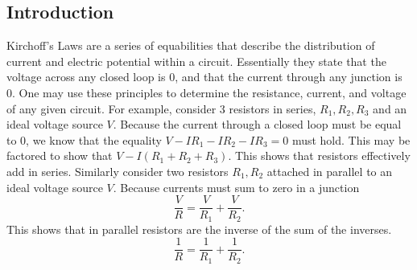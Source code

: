 \documentclass[11pt]{article}
\begin{document}
\subsection{Introduction}
	Kirchoff's Laws are a series of equabilities that describe the distribution of current and electric potential within a circuit. Essentially they state that the voltage across any closed loop is 0, and that the current through any junction is 0. One may use these principles to determine the resistance, current, and voltage of any given circuit. For example, consider 3 resistors in series, \(R_1,R_2,R_3\) and an ideal voltage source \(V\). Because the current through a closed loop must be equal to 0, we know that the equality \( V - I R_1 - I R_2 - I R_3 = 0\) must hold. This may be factored to show that \(V - I(R_1+R_2+R_3) \). This shows that resistors effectively add in series. Similarly consider two resistors \(R_1, R_2\)  attached in parallel to an ideal voltage source \(V\). Because currents must sum to zero in a junction \begin{equation}
	\frac{V}{R} = \frac{V}{R_1} + \frac{V}{R_2}.
	\end{equation}This shows that in parallel resistors are the inverse of the sum of the inverses. \begin{equation} \frac{1}{R} = \frac{1}{R_1} + \frac{1}{R_2}. \end{equation}
\end{document}
